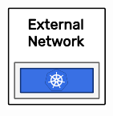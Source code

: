 \begin{figure}
  \centering
  \includegraphics[width=\linewidth]{images/architecture/external_network.pdf}
\end{figure}

